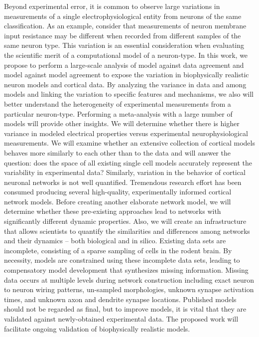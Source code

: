 Beyond experimental error, it is common to observe large variations in measurements of a single electrophysiological entity from neurons of the same classification. As an example, consider that measurements of neuron membrane input resistance may be different when recorded from different samples of the same neuron type. This variation is an essential consideration when evaluating the scientific merit of a computational model of a neuron-type. In this work, we propose to perform a large-scale analysis of model against data agreement and model against model agreement to expose the variation in biophysically realistic neuron models and cortical data. By analyzing the variance in data and among models and linking the variation to specific features and mechanisms, we also will better understand the heterogeneity of experimental measurements from a particular neuron-type. Performing a meta-analysis with a large number of models will provide other insights. We will determine whether there is higher variance in modeled electrical properties versus experimental neurophysiological measurements. We will examine whether an extensive collection of cortical models behaves more similarly to each other than to the data and will answer the question: does the space of all existing single cell models accurately represent the variability in experimental data?
Similarly, variation in the behavior of cortical neuronal networks is not well quantified. Tremendous research effort has been consumed producing several high-quality, experimentally informed cortical network models. Before creating another elaborate network model, we will determine whether these pre-existing approaches lead to networks with significantly different dynamic properties. Also, we will create an infrastructure that allows scientists to quantify the similarities and differences among networks and their dynamics – both biological and in silico.\newline
\newline
Existing data sets are incomplete, consisting of a sparse sampling of cells in the rodent brain. By necessity, models are constrained using these incomplete data sets, leading to compensatory model development that synthesizes missing information. Missing data occurs at multiple levels during network construction including exact neuron to neuron wiring patterns, un-sampled morphologies, unknown synapse activation times, and unknown axon and dendrite synapse locations. Published models should not be regarded as final, but to improve models, it is vital that they are validated against newly-obtained experimental data. The proposed work will facilitate ongoing validation of biophysically realistic models. \newline
\newline

